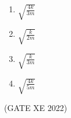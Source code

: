 \begin{enumerate}[label=\thechapter.\arabic*,ref=\thechapter.\theenumi]
\begin{figure}[htbp]
	\label{fig:question_xe76_22}
\end{figure}
\begin{enumerate}[label=(\Alph*)]
\item $\sqrt{\frac{4k}{3m}}$
\item $\sqrt{\frac{k}{2m}}$
\item $\sqrt{\frac{k}{3m}}$
\item $\sqrt{\frac{4k}{5m}}$
\end{enumerate}
\hfill(GATE XE 2022)
\\
\solution

\newpage
\end{enumerate}
